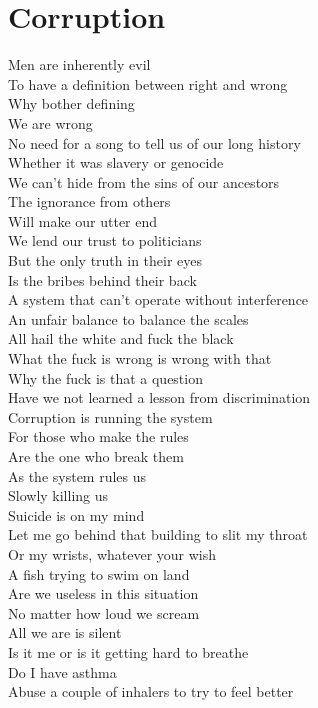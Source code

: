 \documentclass[12pt, b5paper]{article}
\begin{document}
\section{Corruption}
\par Men are inherently evil
\\To have a definition between right and wrong
\\Why bother defining
\\We are wrong
\\No need for a song to tell us of our long history
\\Whether it was slavery or genocide
\\We can't hide from the sins of our ancestors
\\The ignorance from others
\\Will make our utter end
\\We lend our trust to politicians
\\But the only truth in their eyes
\\Is the bribes behind their back
\\A system that can't operate without interference
\\An unfair balance to balance the scales
\\All hail the white and fuck the black
\\What the fuck is wrong is wrong with that
\\Why the fuck is that a question
\\Have we not learned a lesson from discrimination
\\Corruption is running the system
\\For those who make the rules
\\Are the one who break them
\\As the system rules us
\\Slowly killing us
\\Suicide is on my mind
\\Let me go behind that building to slit my throat
\\Or my wrists, whatever your wish
\\A fish trying to swim on land
\\Are we useless in this situation
\\No matter how loud we scream
\\All we are is silent
\\Is it me or is it getting hard to breathe
\\Do I have asthma
\\Abuse a couple of inhalers to try to feel better
\end{document}
